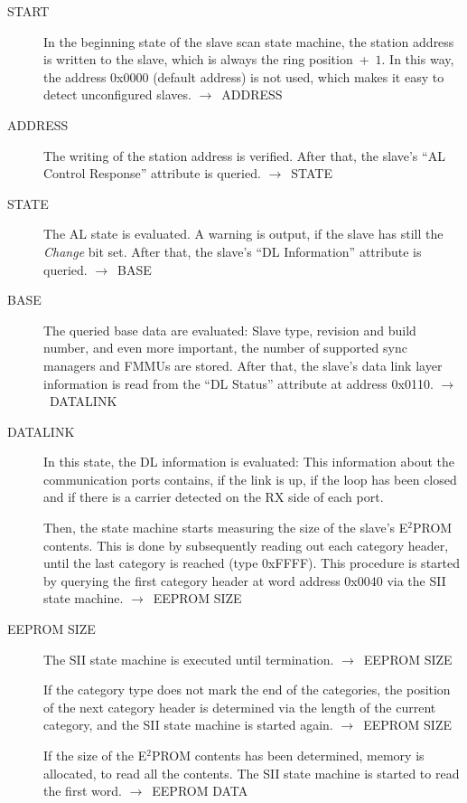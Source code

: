 \documentclass[a4paper,12pt,BCOR6mm,bibtotoc,idxtotoc]{scrbook}
\begin{document}
\begin{description}
\item[START] In the beginning state of the slave scan state machine,
  the station address is written to the slave, which is always the
  ring position~+~$1$. In this way, the address 0x0000 (default
  address) is not used, which makes it easy to detect unconfigured
  slaves.  $\rightarrow$~ADDRESS

\item[ADDRESS] The writing of the station address is verified. After
  that, the slave's ``AL Control Response'' attribute is queried.
  $\rightarrow$~STATE

\item[STATE] The AL state is evaluated. A warning is output, if the
  slave has still the \textit{Change} bit set. After that, the slave's
  ``DL Information'' attribute is queried.
  $\rightarrow$~BASE

\item[BASE] The queried base data are evaluated: Slave type, revision
  and build number, and even more important, the number of supported
  sync managers and FMMUs are stored. After that, the slave's data
  link layer information is read from the ``DL Status'' attribute at
  address 0x0110. $\rightarrow$~DATALINK

\item[DATALINK] In this state, the DL information is evaluated: This
  information about the communication ports contains, if the link is
  up, if the loop has been closed and if there is a carrier detected
  on the RX side of each port.

  Then, the state machine starts measuring the size of the slave's
  E$^2$PROM contents. This is done by subsequently reading out each
  category header, until the last category is reached (type 0xFFFF).
  This procedure is started by querying the first category header at
  word address 0x0040 via the SII state machine.
  $\rightarrow$~EEPROM SIZE

\item[EEPROM SIZE] The SII state machine is executed until
  termination. $\rightarrow$~EEPROM SIZE

  If the category type does not mark the end of the categories, the
  position of the next category header is determined via the length of
  the current category, and the SII state machine is started again.
  $\rightarrow$~EEPROM SIZE

  If the size of the E$^2$PROM contents has been determined, memory is
  allocated, to read all the contents. The SII state machine is
  started to read the first word. $\rightarrow$~EEPROM DATA


\end{description}
\end{document}
